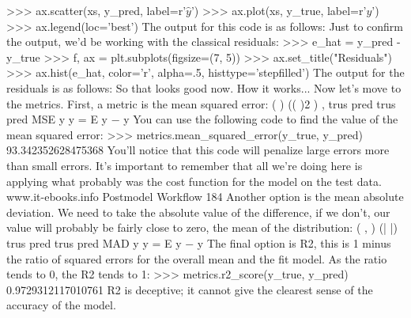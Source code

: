 >>> ax.scatter(xs, y_pred, label=r'$\hat{y}$')
>>> ax.plot(xs, y_true, label=r'$y$')
>>> ax.legend(loc='best')
The output for this code is as follows:
Just to confirm the output, we'd be working with the classical residuals:
>>> e_hat = y_pred - y_true
>>> f, ax = plt.subplots(figsize=(7, 5))
>>> ax.set_title("Residuals")
>>> ax.hist(e_hat, color='r', alpha=.5, histtype='stepfilled')
The output for the residuals is as follows:
So that looks good now.
How it works...
Now let's move to the metrics.
First, a metric is the mean squared error:
( ) (( )2 ) , trus pred trus pred MSE y y = E y − y
You can use the following code to find the value of the mean squared error:
>>> metrics.mean_squared_error(y_true, y_pred)
93.342352628475368
You'll notice that this code will penalize large errors more than small errors. It's important to
remember that all we're doing here is applying what probably was the cost function for the
model on the test data.
www.it-ebooks.info
Postmodel Workflow
184
Another option is the mean absolute deviation. We need to take the absolute value of the
difference, if we don't, our value will probably be fairly close to zero, the mean of the distribution:
( , ) (| |) trus pred trus pred MAD y y = E y − y
The final option is R2, this is 1 minus the ratio of squared errors for the overall mean and the
fit model. As the ratio tends to 0, the R2 tends to 1:
>>> metrics.r2_score(y_true, y_pred)
0.9729312117010761
R2 is deceptive; it cannot give the clearest sense of the accuracy of the model.

